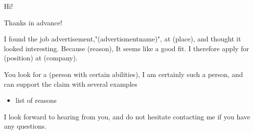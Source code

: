 \documentclass[11pt,a4paper,roman]{moderncv}
\begin{document}
\date{\today}
\opening{Hi!}
\closing{Thanks in advance!}
\makelettertitle



I found the job advertisement,"(advertismentname)", at (place), and thought it looked interesting. Because (reason), It seems like a good fit. I therefore apply for (position) at (company).


You look for a (person with certain abilities), I am certainly such a person, and can support the claim with several examples
\begin{itemize}
\item list of reasons
\end{itemize}


I look forward to hearing from you, and do not hesitate contacting me if you have any questions.

\vspace{0.5cm}


\makeletterclosing
\end{document}
